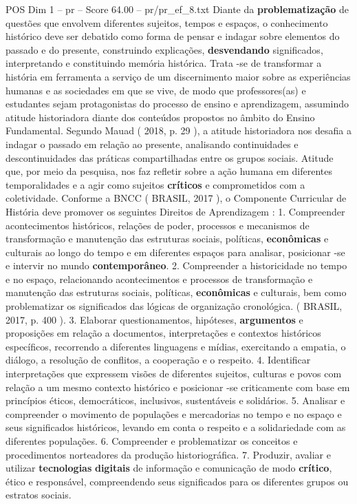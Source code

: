 \begin{textsample}{POS Dim 1 – pr – Score 64.00 – pr/pr\_ef\_8.txt}
Diante da \textbf{problematização} de questões que envolvem diferentes sujeitos, tempos e espaços, o conhecimento histórico deve ser debatido como forma de pensar e indagar sobre elementos do passado e do presente, construindo explicações, \textbf{desvendando} significados, interpretando e constituindo memória histórica.
Trata -se de transformar a história em ferramenta a serviço de um discernimento maior sobre as experiências humanas e as sociedades em que se vive, de modo que professores(as) e estudantes sejam protagonistas do processo de ensino e aprendizagem, assumindo atitude historiadora diante dos conteúdos propostos no âmbito do Ensino Fundamental.
Segundo Mauad ( 2018, p. 29 ), a atitude historiadora nos desafia a indagar o passado em relação ao presente, analisando continuidades e descontinuidades das práticas compartilhadas entre os grupos sociais.
Atitude que, por meio da pesquisa, nos faz refletir sobre a ação humana em diferentes temporalidades e a agir como sujeitos \textbf{críticos} e comprometidos com a coletividade.
Conforme a BNCC ( BRASIL, 2017 ), o Componente Curricular de História deve promover os seguintes Direitos de Aprendizagem : 1.
Compreender acontecimentos históricos, relações de poder, processos e mecanismos de transformação e manutenção das estruturas sociais, políticas, \textbf{econômicas} e culturais ao longo do tempo e em diferentes espaços para analisar, posicionar -se e intervir no mundo \textbf{contemporâneo}. 2.
Compreender a historicidade no tempo e no espaço, relacionando acontecimentos e processos de transformação e manutenção das estruturas sociais, políticas, \textbf{econômicas} e culturais, bem como problematizar os significados das lógicas de organização cronológica. ( BRASIL, 2017, p. 400 ). 3.
Elaborar questionamentos, hipóteses, \textbf{argumentos} e proposições em relação a documentos, interpretações e contextos históricos específicos, recorrendo a diferentes linguagens e mídias, exercitando a empatia, o diálogo, a resolução de conflitos, a cooperação e o respeito. 4.
Identificar interpretações que expressem visões de diferentes sujeitos, culturas e povos com relação a um mesmo contexto histórico e posicionar -se criticamente com base em princípios éticos, democráticos, inclusivos, sustentáveis e solidários. 5.
Analisar e compreender o movimento de populações e mercadorias no tempo e no espaço e seus significados históricos, levando em conta o respeito e a solidariedade com as diferentes populações. 6.
Compreender e problematizar os conceitos e procedimentos norteadores da produção historiográfica. 7.
Produzir, avaliar e utilizar \textbf{tecnologias} \textbf{digitais} de informação e comunicação de modo \textbf{crítico}, ético e responsável, compreendendo seus significados para os diferentes grupos ou estratos sociais.

\end{textsample}
